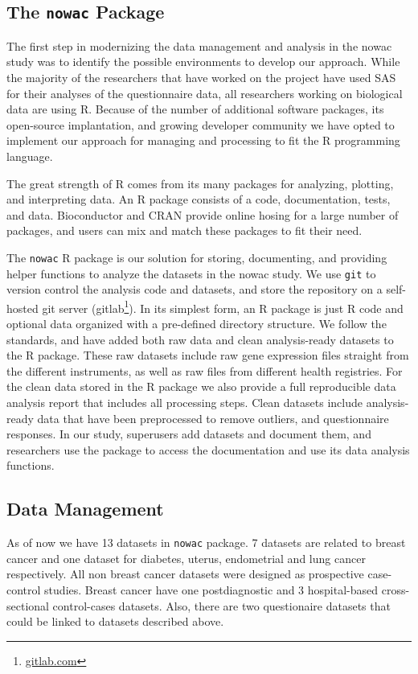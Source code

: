 \subsection{The \texttt{nowac} Package} 
The first step in modernizing the data management and analysis in the
\gls{nowac} study was to identify the possible environments to develop our
approach. While the majority of the researchers that have worked on the project
have used SAS for their analyses of the questionnaire data, all researchers
working on biological data are using R. Because of the number of additional
software  packages, its open-source implantation, and growing developer
community we have opted to implement our approach for managing and processing to
fit the R programming language. 

The great strength of R comes from its many packages for analyzing, plotting,
and interpreting data. An R package consists of a code, documentation, tests,
and data. Bioconductor and CRAN provide online hosing for a large number of
packages, and users can mix and match these packages to fit their need. 

The \texttt{nowac} R package is our solution for storing, documenting, and
providing helper functions to analyze the datasets in the \gls{nowac} study. We
use \texttt{git} to version control the analysis code and datasets, and store
the repository on a self-hosted git server (gitlab\footnote{\url{gitlab.com}}).
In its simplest form, an R package is just R code and optional data organized
with a pre-defined directory structure. We follow the standards, and have added
both raw data and clean analysis-ready datasets to the R package. These raw
datasets include raw gene expression files straight from the different
instruments, as well as raw files from different health registries. For the
clean data stored in the R package we also provide a full reproducible data
analysis report that includes all processing steps. Clean datasets include
analysis-ready data that have been preprocessed to remove outliers, and
questionnaire responses. In our study, superusers add datasets and document
them, and researchers use the package to access the documentation and use its
data analysis functions. 


\subsection{Data Management}
As of now we have 13 datasets in \texttt{nowac} package. 7 datasets are related
to breast cancer and one dataset for diabetes, uterus, endometrial and lung
cancer respectively. All non breast cancer datasets were designed as prospective
case-control studies.  Breast cancer have one postdiagnostic and 3
hospital-based cross-sectional control-cases datasets. Also, there are two
questionaire datasets that could be linked to datasets described above.

